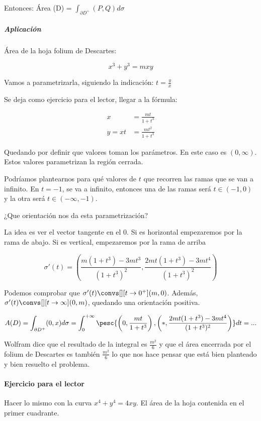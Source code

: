 Entonces: Área (D) = $\displaystyle\int_{\partial  D^+} (P,Q)d\sigma$

\subparagraph{Aplicación} Área de la hoja folium de Descartes:

\[x^3+y^3 = mxy\]



Vamos a parametrizarla, siguiendo la indicación: $t = \frac{y}{x}$

Se deja como ejercicio para el lector, llegar a la fórmula:

\[\begin{array}{cc}
x&=\displaystyle\frac{mt}{1+t^3}\\
y= xt &= \displaystyle\frac{mt^2}{1+t^3}
\end{array}\]

Quedando por definir que valores toman los parámetros. En este caso es $(0,\infty)$. Estos valores parametrizan la región cerrada. 

Podríamos plantearnos para qué valores de $t$ que recorren las ramas que se van a infinito. En $t=-1$, se va a infinito, entonces una de las ramas será $t\in(-1,0)$ y la otra será $t\in(-\infty,-1)$.

¿Que orientación nos da esta parametrización?

La idea es ver el vector tangente en el 0. Si es horizontal empezaremos por la rama de abajo. Si es vertical, empezaremos por la rama de arriba

\[\sigma'(t) = \left(\frac{m(1+t^3)-3mt^3}{(1+t^3)^2},\frac{2mt(1+t^3) - 3mt^4}{(1+t^3)^2}\right)\]

Podemos comprobar que $\sigma'(t) \convs[][t\to 0^+] (m,0)$. Además, $\sigma'(t) \convs[][t\to\infty](0,m)$, quedando una orientación positiva.

\[
A(D) = \int_{\partial  D^+} (0,x)d\sigma = \int_0^{+\infty} \pesc{\left(0,\frac{mt}{1+t^3}\right), \left(\ast,\frac{2mt(1+t^3)-3mt^4}{(1+t^3)^2}\right)}dt = ...
\]

Wolfram dice que el resultado de la integral es $\frac{m^2}{6}$ y que el área encerrada por el folium de Descartes es también $\frac{m^2}{6}$ lo que nos hace pensar que está bien planteado y bien resuelto el problema.


\paragraph{Ejercicio para el lector} Hacer lo mismo con la curva $x^4+y^4=4xy$. El área de la hoja contenida en el primer cuadrante.

